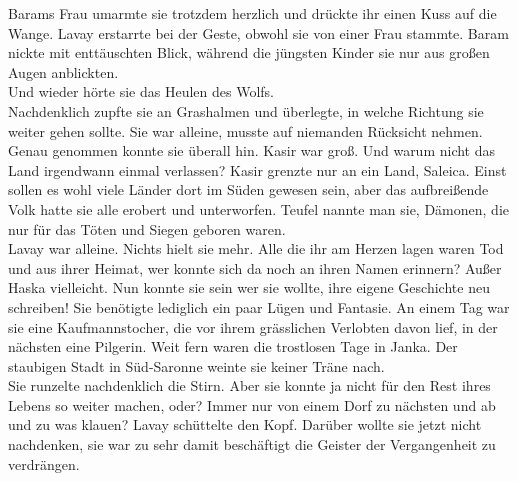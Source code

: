Barams Frau umarmte sie trotzdem herzlich und drückte ihr einen Kuss auf die Wange. Lavay erstarrte 
bei der Geste, obwohl sie von einer Frau stammte. Baram nickte mit enttäuschten Blick, während die 
jüngsten Kinder sie nur aus großen Augen anblickten.\\
Und wieder hörte sie das Heulen des Wolfs.\\
Nachdenklich zupfte sie an Grashalmen und überlegte, in welche Richtung sie weiter gehen sollte. Sie 
war alleine, musste auf niemanden Rücksicht nehmen. Genau genommen konnte sie überall hin. Kasir 
war groß. Und warum nicht das Land irgendwann einmal verlassen? Kasir grenzte nur an ein Land, 
Saleica. Einst sollen es wohl viele Länder dort im Süden gewesen sein, aber das aufbreißende 
Volk hatte sie alle erobert und unterworfen. Teufel nannte man sie, Dämonen, die nur für das 
Töten und Siegen geboren waren.\\
Lavay war alleine. Nichts hielt sie mehr. Alle die ihr am Herzen lagen waren Tod und aus ihrer 
Heimat, wer konnte sich da noch an ihren Namen erinnern? Außer Haska vielleicht. Nun konnte sie 
sein wer sie wollte, ihre eigene Geschichte neu schreiben! Sie benötigte lediglich ein paar Lügen 
und Fantasie. An einem Tag war sie eine Kaufmannstocher, die vor ihrem grässlichen Verlobten davon 
lief, in der nächsten eine Pilgerin. Weit fern waren die trostlosen Tage in Janka. Der staubigen 
Stadt in Süd-Saronne weinte sie keiner Träne nach.\\
Sie runzelte nachdenklich die Stirn. Aber sie konnte ja nicht für den Rest ihres Lebens so weiter 
machen, oder? Immer nur von einem Dorf zu nächsten und ab und zu was klauen? Lavay schüttelte den 
Kopf. Darüber wollte sie jetzt nicht nachdenken, sie war zu sehr damit beschäftigt die Geister der 
Vergangenheit zu verdrängen.\\